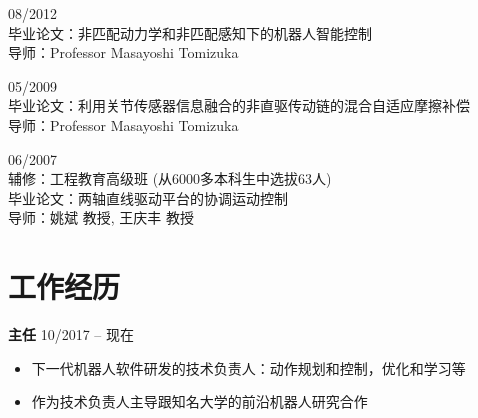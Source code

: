 \documentclass[UTF8,nofonts]{res}
\begin{document}
\begin{resume}
       \hfill 08/2012\\
    {\normalfont 毕业论文：非匹配动力学和非匹配感知下的机器人智能控制\\
    导师：Professor Masayoshi Tomizuka}

       \hfill 05/2009\\
    {\normalfont 毕业论文：利用关节传感器信息融合的非直驱传动链的混合自适应摩擦补偿\\
    导师：Professor Masayoshi Tomizuka}

       \hfill 06/2007\\
     \hfill \normalfont 辅修：工程教育高级班 (从6000多本科生中选拔63人)\\
    {\normalfont 毕业论文：两轴直线驱动平台的协调运动控制\\
    导师：姚斌 教授, 王庆丰 教授}


\section{工作经历}
\vspace{0.1in}
\begin{list}{}{\setlength\leftmargin{0in}\setlength\topsep{0.15in}}

\item {}  {\bf 主任} \hfill 10/2017 -- {\normalfont 现在}
\begin{itemize}
	\item 下一代机器人软件研发的技术负责人：动作规划和控制，优化和学习等
	\item 作为技术负责人主导跟知名大学的前沿机器人研究合作
\end{itemize}


\end{list}
\end{resume}
\end{document}
